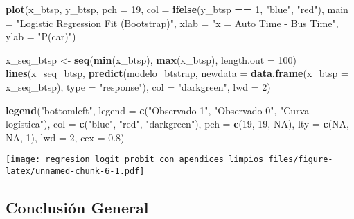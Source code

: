 \documentclass[
]{article}
\newenvironment{Shaded}{\begin{snugshade}}{\end{snugshade}}
\newcommand{\AttributeTok}[1]{\textcolor[rgb]{0.13,0.29,0.53}{#1}}
\newcommand{\ConstantTok}[1]{\textcolor[rgb]{0.56,0.35,0.01}{#1}}
\newcommand{\DecValTok}[1]{\textcolor[rgb]{0.00,0.00,0.81}{#1}}
\newcommand{\FloatTok}[1]{\textcolor[rgb]{0.00,0.00,0.81}{#1}}
\newcommand{\FunctionTok}[1]{\textcolor[rgb]{0.13,0.29,0.53}{\textbf{#1}}}
\newcommand{\NormalTok}[1]{#1}
\newcommand{\OtherTok}[1]{\textcolor[rgb]{0.56,0.35,0.01}{#1}}
\newcommand{\SpecialCharTok}[1]{\textcolor[rgb]{0.81,0.36,0.00}{\textbf{#1}}}
\newcommand{\StringTok}[1]{\textcolor[rgb]{0.31,0.60,0.02}{#1}}
\begin{document}
\begin{Shaded}
\begin{Highlighting}[]
\FunctionTok{plot}\NormalTok{(x\_btsp, y\_btsp, }\AttributeTok{pch =} \DecValTok{19}\NormalTok{, }\AttributeTok{col =} \FunctionTok{ifelse}\NormalTok{(y\_btsp }\SpecialCharTok{==} \DecValTok{1}\NormalTok{, }\StringTok{"blue"}\NormalTok{, }\StringTok{"red"}\NormalTok{),}
     \AttributeTok{main =} \StringTok{"Logistic Regression Fit (Bootstrap)"}\NormalTok{, }\AttributeTok{xlab =} \StringTok{"x = Auto Time {-} Bus Time"}\NormalTok{, }\AttributeTok{ylab =} \StringTok{"P(car)"}\NormalTok{)}

\NormalTok{x\_seq\_btsp }\OtherTok{\textless{}{-}} \FunctionTok{seq}\NormalTok{(}\FunctionTok{min}\NormalTok{(x\_btsp), }\FunctionTok{max}\NormalTok{(x\_btsp), }\AttributeTok{length.out =} \DecValTok{100}\NormalTok{)}
\FunctionTok{lines}\NormalTok{(x\_seq\_btsp, }\FunctionTok{predict}\NormalTok{(modelo\_btstrap, }\AttributeTok{newdata =} \FunctionTok{data.frame}\NormalTok{(}\AttributeTok{x\_btsp =}\NormalTok{ x\_seq\_btsp), }\AttributeTok{type =} \StringTok{"response"}\NormalTok{),}
      \AttributeTok{col =} \StringTok{"darkgreen"}\NormalTok{, }\AttributeTok{lwd =} \DecValTok{2}\NormalTok{)}

\FunctionTok{legend}\NormalTok{(}\StringTok{"bottomleft"}\NormalTok{, }\AttributeTok{legend =} \FunctionTok{c}\NormalTok{(}\StringTok{"Observado 1"}\NormalTok{, }\StringTok{"Observado 0"}\NormalTok{, }\StringTok{"Curva logística"}\NormalTok{),}
       \AttributeTok{col =} \FunctionTok{c}\NormalTok{(}\StringTok{"blue"}\NormalTok{, }\StringTok{"red"}\NormalTok{, }\StringTok{"darkgreen"}\NormalTok{), }\AttributeTok{pch =} \FunctionTok{c}\NormalTok{(}\DecValTok{19}\NormalTok{, }\DecValTok{19}\NormalTok{, }\ConstantTok{NA}\NormalTok{), }\AttributeTok{lty =} \FunctionTok{c}\NormalTok{(}\ConstantTok{NA}\NormalTok{, }\ConstantTok{NA}\NormalTok{, }\DecValTok{1}\NormalTok{), }\AttributeTok{lwd =} \DecValTok{2}\NormalTok{, }\AttributeTok{cex =} \FloatTok{0.8}\NormalTok{)}
\end{Highlighting}
\end{Shaded}

\texttt{[image: regresion\_logit\_probit\_con\_apendices\_limpios\_files/figure-latex/unnamed-chunk-6-1.pdf]}

\subsection{Conclusión General}\label{conclusiuxf3n-general}
\end{document}
